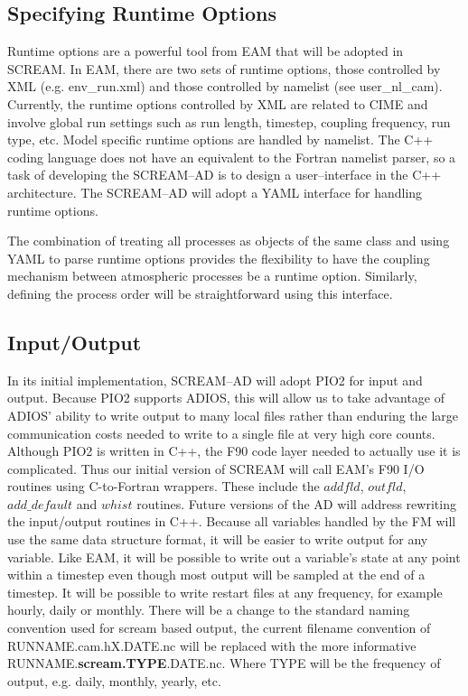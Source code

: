 \subsection{Specifying Runtime Options}
\label{sec:run_config}

Runtime options are a powerful tool from EAM that will be adopted in SCREAM.  In EAM, there are two sets of runtime options, those controlled by XML (e.g. env\_run.xml) and those controlled by namelist (see user\_nl\_cam).  Currently, the runtime options controlled by XML are related to CIME and involve global run settings such as run length, timestep, coupling frequency, run type, etc.  Model specific runtime options are handled by namelist.  The C++ coding language does not have an equivalent to the Fortran namelist parser, so a task of developing the SCREAM--AD is to design a user--interface in the C++ architecture.  The SCREAM--AD will adopt a YAML interface for handling runtime options.  

The combination of treating all processes as objects of the same class and using YAML to parse runtime options provides the flexibility to have the coupling mechanism between atmospheric processes be a runtime option.  Similarly, defining the process order will be straightforward using this interface.  

\subsection{Input/Output}
\label{sec:similarities}

In its initial implementation, SCREAM--AD will adopt PIO2 for input and output. Because PIO2 supports ADIOS, this will allow us to take advantage of ADIOS' ability to write output to many local files rather than enduring the large communication costs needed to write to a single file at very high core counts.  Although PIO2 is written in C++, the F90 code layer needed to actually use it is complicated. Thus our initial version of SCREAM will call EAM's F90 I/O routines using C-to-Fortran wrappers.  These include the $addfld$, $outfld$, $add\_default$ and $whist$ routines.  Future versions of the AD will address rewriting the input/output routines in C++.  Because all variables handled by the FM will use the same data structure format, it will be easier to write output for any variable.  Like EAM, it will be possible to write out a variable's state at any point within a timestep even though most output will be sampled at the end of a timestep.  It will be possible to write restart files at any frequency, for example hourly, daily or monthly.  There will be a change to the standard naming convention used for scream based output, the current filename convention of RUNNAME.cam.hX.DATE.nc will be replaced with the more informative RUNNAME.{\bf scream.TYPE}.DATE.nc.  Where TYPE will be the frequency of output, e.g. daily, monthly, yearly, etc.

